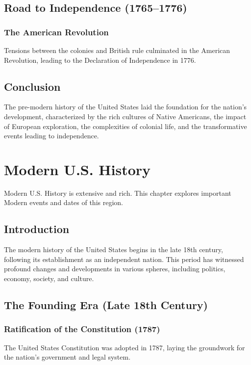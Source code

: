 \documentclass[a4paper,12pt]{book}
\begin{document}
\section{Road to Independence (1765–1776)}
\label{sec:road-independence}
\subsection{The American Revolution}
\label{subsec:american-revolution}
Tensions between the colonies and British rule culminated in the American Revolution, leading to the Declaration of Independence in 1776.

\section{Conclusion}
\label{sec:conclusion-pre-modern-usa}
The pre-modern history of the United States laid the foundation for the nation’s development, characterized by the rich cultures of Native Americans, the impact of European exploration, the complexities of colonial life, and the transformative events leading to independence.

\chapter{Modern U.S. History}
\label{ch:modern-us-history}

Modern U.S. History is extensive and rich. This chapter explores important Modern events and dates of this region.

\section{Introduction}
\label{sec:introduction-modern-usa}
The modern history of the United States begins in the late 18th century, following its establishment as an independent nation. This period has witnessed profound changes and developments in various spheres, including politics, economy, society, and culture.

\section{The Founding Era (Late 18th Century)}
\label{sec:founding-era}
\subsection{Ratification of the Constitution (1787)}
\label{subsec:ratification-constitution}
The United States Constitution was adopted in 1787, laying the groundwork for the nation’s government and legal system.
\end{document}
